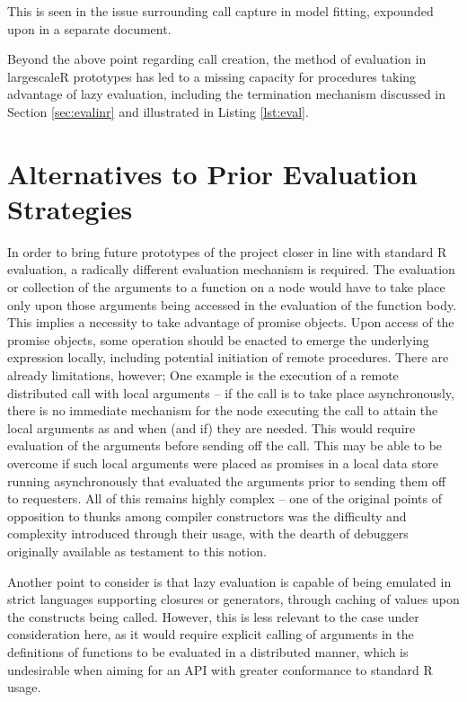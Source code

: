\documentclass[10pt,a4paper]{article}
\begin{document}
This is seen in the issue surrounding call capture in model fitting, expounded upon in a separate document.

Beyond the above point regarding call creation, the method of evaluation in largescaleR prototypes has led to a missing capacity for procedures taking advantage of lazy evaluation, including the termination mechanism discussed in Section \ref{sec:evalinr} and illustrated in Listing \ref{lst:eval}.

\section{Alternatives to Prior Evaluation Strategies}

In order to bring future prototypes of the project closer in line with standard R evaluation, a radically different evaluation mechanism is required.
The evaluation or collection of the arguments to a function on a node would have to take place only upon those arguments being accessed in the evaluation of the function body.
This implies a necessity to take advantage of promise objects.
Upon access of the promise objects, some operation should be enacted to emerge the underlying expression locally, including potential initiation of remote procedures.
There are already limitations, however;
One example is the execution of a remote distributed call with local arguments -- if the call is to take place asynchronously, there is no immediate mechanism for the node executing the call to attain the local arguments as and when (and if) they are needed.
This would require evaluation of the arguments before sending off the call.
This may be able to be overcome if such local arguments were placed as promises in a local data store running asynchronously that evaluated the arguments prior to sending them off to requesters.
All of this remains highly complex -- one of the original points of opposition to thunks \cite{ingerman1961thunks}among compiler constructors was the difficulty and complexity introduced through their usage, with the dearth of debuggers originally available as testament to this notion.

Another point to consider is that lazy evaluation is capable of being emulated in strict languages supporting closures or generators, through caching of values upon the constructs being called.
However, this is less relevant to the case under consideration here, as it would require explicit calling of arguments in the definitions of functions to be evaluated in a distributed manner, which is undesirable when aiming for an API with greater conformance to standard R usage.
\end{document}
